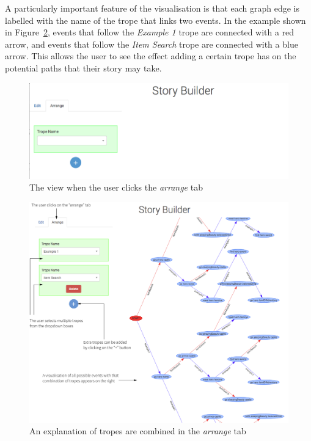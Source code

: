\documentclass[11pt]{report}
\begin{document}
A particularly important feature of the visualisation is that each graph edge is
labelled with the name of the trope that links two events. In the example
shown in Figure~\ref{fig:sb-combine-ann}, events that follow the \emph{Example
  1} trope are connected with a red arrow, and events that follow the \emph{Item
Search} trope are connected with a blue arrow. This allows the user to see
the effect adding a certain trope has on the potential paths that their story
may take.

\begin{figure}[!h]
\centerline{\includegraphics[width=\textwidth]{storybuilder6.png}}
\caption{The view when the user clicks the \emph{arrange} tab}\label{fig:sb-arrange}
\end{figure}

\begin{figure}[!h]
\centerline{\includegraphics[width=\textwidth]{storybuilder-combine1.png}}
\caption{An explanation of tropes are combined in the \emph{arrange} tab}\label{fig:sb-combine-ann}
\end{figure}
\end{document}
